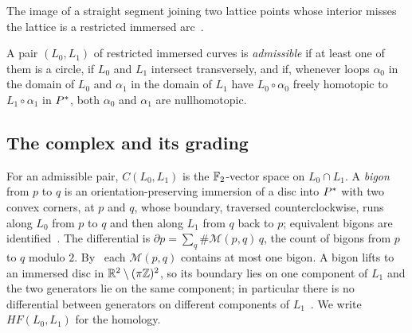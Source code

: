 The image of a straight segment joining two lattice points whose interior misses the lattice is a
restricted immersed arc~\cite[p.~18]{HHK2}.

\begin{definition}\label{def:admissible}
A pair $(L_0,L_1)$ of restricted immersed curves is \emph{admissible} if at least one of them is a circle,
if $L_0$ and $L_1$ intersect transversely, and if, whenever loops $\alpha_0$ in the domain of $L_0$ and
$\alpha_1$ in the domain of $L_1$ have $L_0\circ\alpha_0$ freely homotopic to $L_1\circ\alpha_1$ in $P^{*}$, both
$\alpha_0$ and $\alpha_1$ are nullhomotopic.
\end{definition}

\subsection{The complex and its grading}\label{ss:complex}
For an admissible pair, $C(L_0,L_1)$ is the $\mathbb{F}_2$-vector space on $L_0\cap L_1$. A \emph{bigon} from $p$ to
$q$ is an orientation-preserving immersion of a disc into $P^{*}$ with two convex corners, at $p$ and $q$,
whose boundary, traversed counterclockwise, runs along $L_0$ from $p$ to $q$ and then along $L_1$ from $q$
back to $p$; equivalent bigons are identified~\cite[Def.~2.10, (5)]{HHK2}. The differential is
$\partial p=\sum_q\#\mathcal M(p,q)\,q$, the count of bigons from $p$ to $q$ modulo $2$. By~\cite[Cor.~3.13]{HHK2}
each $\mathcal M(p,q)$ contains at most one bigon. A bigon lifts to an immersed disc in $\mathbb{R}^2\setminus(\pi\mathbb{Z})^2$,
so its boundary lies on one component of $L_1$ and the two generators lie on the same component; in
particular there is no differential between generators on different components of
$L_1$~\cite[p.~37]{HHK2}. We write $HF(L_0,L_1)$ for the homology.

